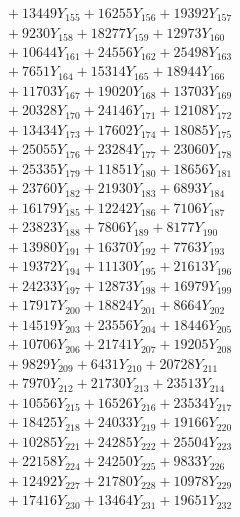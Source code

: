 \documentclass[a4paper,10pt]{article}
\begin{document}
{\begin{align}
&\;  + 13449 Y_{155} + 16255 Y_{156} + 19392 Y_{157} \\[0.3ex]
&\;  + 9230 Y_{158} + 18277 Y_{159} + 12973 Y_{160} \\[0.3ex]
&\;  + 10644 Y_{161} + 24556 Y_{162} + 25498 Y_{163} \\[0.3ex]
&\;  + 7651 Y_{164} + 15314 Y_{165} + 18944 Y_{166} \\[0.3ex]
&\;  + 11703 Y_{167} + 19020 Y_{168} + 13703 Y_{169} \\[0.3ex]
&\;  + 20328 Y_{170} + 24146 Y_{171} + 12108 Y_{172} \\[0.3ex]
&\;  + 13434 Y_{173} + 17602 Y_{174} + 18085 Y_{175} \\[0.3ex]
&\;  + 25055 Y_{176} + 23284 Y_{177} + 23060 Y_{178} \\[0.5ex]\allowbreak
&\;  + 25335 Y_{179} + 11851 Y_{180} + 18656 Y_{181} \\[0.3ex]
&\;  + 23760 Y_{182} + 21930 Y_{183} + 6893 Y_{184} \\[0.3ex]
&\;  + 16179 Y_{185} + 12242 Y_{186} + 7106 Y_{187} \\[0.3ex]
&\;  + 23823 Y_{188} + 7806 Y_{189} + 8177 Y_{190} \\[0.3ex]
&\;  + 13980 Y_{191} + 16370 Y_{192} + 7763 Y_{193} \\[0.3ex]
&\;  + 19372 Y_{194} + 11130 Y_{195} + 21613 Y_{196} \\[0.3ex]
&\;  + 24233 Y_{197} + 12873 Y_{198} + 16979 Y_{199} \\[0.3ex]
&\;  + 17917 Y_{200} + 18824 Y_{201} + 8664 Y_{202} \\[0.3ex]
&\;  + 14519 Y_{203} + 23556 Y_{204} + 18446 Y_{205} \\[0.3ex]
&\;  + 10706 Y_{206} + 21741 Y_{207} + 19205 Y_{208} \\[0.5ex]\allowbreak
&\;  + 9829 Y_{209} + 6431 Y_{210} + 20728 Y_{211} \\[0.3ex]
&\;  + 7970 Y_{212} + 21730 Y_{213} + 23513 Y_{214} \\[0.3ex]
&\;  + 10556 Y_{215} + 16526 Y_{216} + 23534 Y_{217} \\[0.3ex]
&\;  + 18425 Y_{218} + 24033 Y_{219} + 19166 Y_{220} \\[0.3ex]
&\;  + 10285 Y_{221} + 24285 Y_{222} + 25504 Y_{223} \\[0.3ex]
&\;  + 22158 Y_{224} + 24250 Y_{225} + 9833 Y_{226} \\[0.3ex]
&\;  + 12492 Y_{227} + 21780 Y_{228} + 10978 Y_{229} \\[0.3ex]
&\;  + 17416 Y_{230} + 13464 Y_{231} + 19651 Y_{232} \\[0.3ex]

\end{align}}
\end{document}
